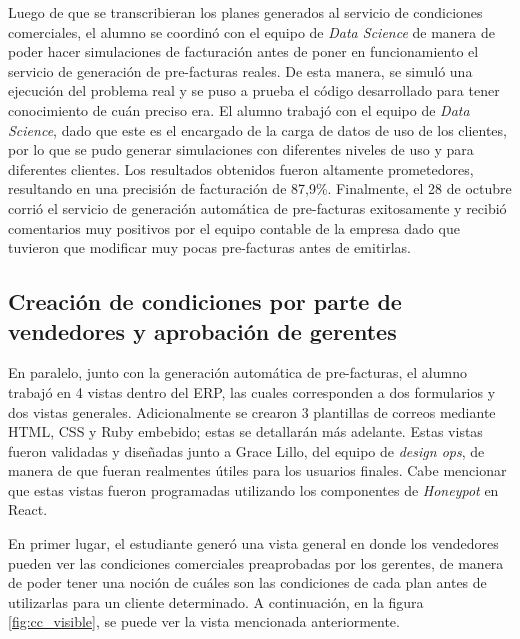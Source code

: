     Luego de que se transcribieran los planes generados al servicio de condiciones comerciales, el alumno se coordinó con el equipo de \textit{Data Science} de manera de poder hacer simulaciones de facturación antes de poner en funcionamiento el servicio de generación de pre-facturas reales. De esta manera, se simuló una ejecución del problema real y se puso a prueba el código desarrollado para tener conocimiento de cuán preciso era. El alumno trabajó con el equipo de \textit{Data Science}, dado que este es el encargado de la carga de datos de uso de los clientes, por lo que se pudo generar simulaciones con diferentes niveles de uso y para diferentes clientes. Los resultados obtenidos fueron altamente prometedores, resultando en una precisión de facturación de 87,9\%. Finalmente, el 28 de octubre corrió el servicio de generación automática de pre-facturas exitosamente y recibió comentarios muy positivos por el equipo contable de la empresa dado que tuvieron que modificar muy pocas pre-facturas antes de emitirlas.

  \subsection{Creación de condiciones por parte de vendedores y aprobación de gerentes}
    En paralelo, junto con la generación automática de pre-facturas, el alumno trabajó en 4 vistas dentro del ERP, las cuales corresponden a dos formularios y dos vistas generales. Adicionalmente se crearon 3 plantillas de correos mediante HTML, CSS y Ruby embebido; estas se detallarán más adelante. Estas vistas fueron validadas y diseñadas junto a Grace Lillo, del equipo de \textit{design ops}, de manera de que fueran realmentes útiles para los usuarios finales. Cabe mencionar que estas vistas fueron programadas utilizando los componentes de \textit{Honeypot} en React. 
    
    En primer lugar, el estudiante generó una vista general en donde los vendedores pueden ver las condiciones comerciales preaprobadas por los gerentes, de manera de poder tener una noción de cuáles son las condiciones de cada plan antes de utilizarlas para un cliente determinado. A continuación, en la figura \ref{fig:cc_visible}, se puede ver la vista mencionada anteriormente.

